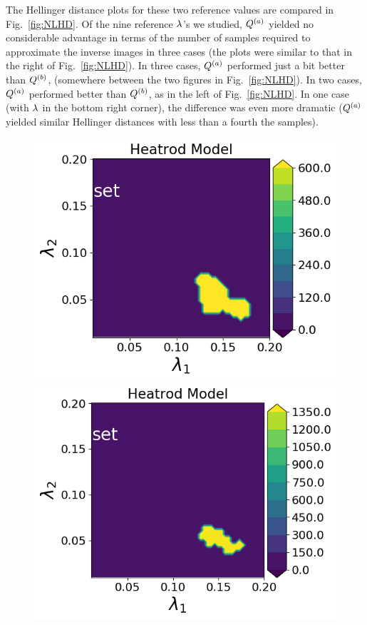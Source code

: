 The Hellinger distance plots for these two reference values are compared in Fig.~\ref{fig:NLHD}.
Of the nine reference $\lambda$'s we studied, $Q^{(a)}$ yielded no considerable advantage in terms of the number of samples required to approximate the inverse images in three cases (the plots were similar to that in the right of Fig.~\ref{fig:NLHD}).
In three cases, $Q^{(a)}$ performed just a bit better than $Q^{(b)}$, (somewhere between the two figures in Fig.~\ref{fig:NLHD}).
In two cases, $Q^{(a)}$ performed better than  $Q^{(b)}$, as in the left of Fig.~\ref{fig:NLHD}.
In one case (with $\lambda$ in the bottom right corner), the difference was even more dramatic ($Q^{(a)}$ yielded similar Hellinger distances with less than a fourth the samples).

\begin{figure}[h]
\begin{minipage}{.4\textwidth}
\includegraphics[width=\linewidth]{examples/fig_heatrod_q1/HeatrodModel--set_N50_em.png}
\includegraphics[width=\linewidth]{examples/fig_heatrod_q1/HeatrodModel--set_N500_em.png}


\end{minipage}
\end{figure}
